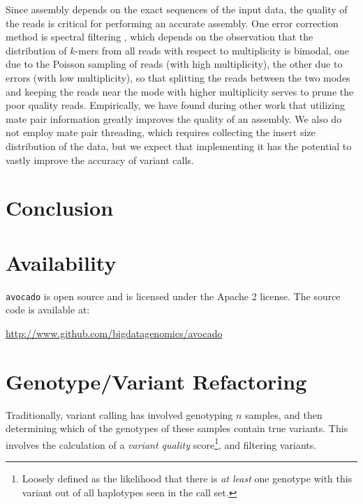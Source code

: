\documentclass{acm_proc_article-sp}
\begin{document}
Since assembly depends on the exact sequences of the input data, the quality of
the reads is critical for performing an accurate assembly.
One error correction method is spectral filtering \cite{pevzner01}, which depends
on the observation that the distribution of $k$-mers from all reads with respect to
multiplicity is bimodal, one due to the Poisson sampling of reads (with high
multiplicity), the other due to errors (with low multiplicity), so that splitting
the reads between the two modes and keeping the reads near the mode with higher
multiplicity serves to prune the poor quality reads.
Empirically, we have found during other work that utilizing mate pair
information greatly improves the quality of an assembly. %
We also do not employ mate pair threading, which requires collecting the
insert size distribution of the data, but we expect that implementing it has
the potential to vastly improve the accuracy of variant calls.

\section{Conclusion}
\label{sec:conclusion}

\appendix

\section{Availability}
\label{sec:availability}

\texttt{avocado} is open source and is licensed under the Apache 2 license. The source code is available at:

\url{http://www.github.com/bigdatagenomics/avocado}

\section{Genotype/Variant Refactoring}
\label{sec:genotype-variant-refactoring}

Traditionally, variant calling has involved genotyping $n$ samples, and then determining which of the genotypes of these samples
contain true variants. This involves the calculation of a \textit{variant quality} score\footnote{Loosely defined as the likelihood that
there is \emph{at least} one genotype with this variant out of all haplotypes seen in the call set.}, and filtering variants.
\end{document}
